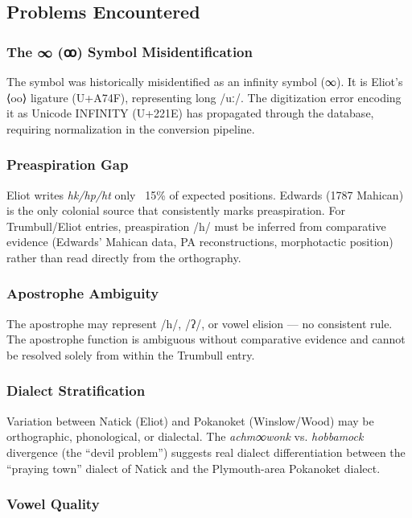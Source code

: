 \subsection{Problems Encountered}

\subsubsection{The ∞ (ꝏ) Symbol Misidentification}

The symbol was historically misidentified as an infinity symbol (∞). It is
Eliot's ⟨oo⟩ ligature (U+A74F), representing long /uː/. The digitization
error encoding it as Unicode INFINITY (U+221E) has propagated through the
database, requiring normalization in the conversion pipeline.

\subsubsection{Preaspiration Gap}

Eliot writes \textit{hk/hp/ht} only ~15\% of expected positions. Edwards
(1787 Mahican) is the only colonial source that consistently marks
preaspiration. For Trumbull/Eliot entries, preaspiration /h/ must be inferred
from comparative evidence (Edwards' Mahican data, PA reconstructions,
morphotactic position) rather than read directly from the orthography.

\subsubsection{Apostrophe Ambiguity}

The apostrophe may represent /h/, /ʔ/, or vowel elision --- no consistent
rule. The apostrophe function is ambiguous without comparative evidence and
cannot be resolved solely from within the Trumbull entry.

\subsubsection{Dialect Stratification}

Variation between Natick (Eliot) and Pokanoket (Winslow/Wood) may be
orthographic, phonological, or dialectal. The \textit{achm∞wonk} vs.
\textit{hobbamock} divergence (the ``devil problem'') suggests real dialect
differentiation between the ``praying town'' dialect of Natick and the
Plymouth-area Pokanoket dialect.

\subsubsection{Vowel Quality}

